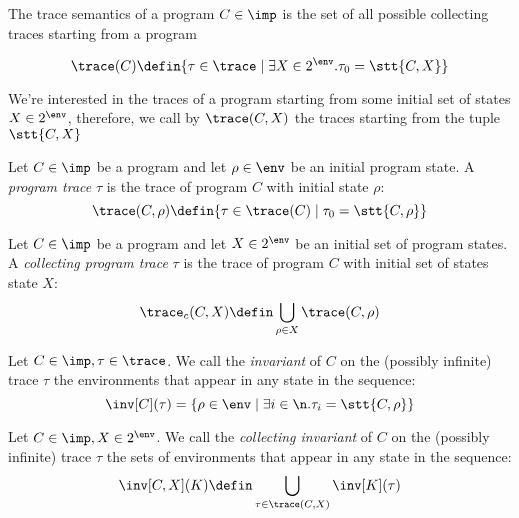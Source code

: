 \begin{definition}
  The trace semantics of a program \(C\in\imp\) is the set of all
  possible collecting traces starting from a program
  
  \[\trace(C) \defin \{\tau \in \trace \mid \exists X \in 2^\env . \tau_0 = \stt{ C, X } \}\]

\end{definition}

We're interested in the traces of a program starting from some initial
set of states \(X \in 2^\env\), therefore, we call by \(\trace
(C,X)\) the traces starting from the tuple \(\stt{ C, X
}\)

\begin{definition}
  Let \(C \in \imp\) be a program and let \(\rho \in \env\) be an
  initial program state. A \emph{program trace} \(\tau\) is the trace
  of program \(C\) with initial state \(\rho\): \[\trace (C,\rho) \defin
  \{\tau \in \trace (C) \mid \tau_0 = \stt{ C, \rho }\}\]
\end{definition}

\begin{definition}
  Let \(C \in \imp\) be a program and let \(X \in 2^\env\) be an
  initial set of program states. A \emph{collecting program trace}
  \(\tau\) is the trace of program \(C\) with initial set of states
  state \(X\): \[\trace_c (C,X) \defin \bigcup_{\rho \in
    X}\trace(C,\rho)\]
\end{definition}


\begin{definition}
  Let \(C \in \imp, \tau \in \trace\). We call the \emph{invariant} of
  \(C\) on the (possibly infinite) trace \(\tau\) the environments
  that appear in any state in the sequence: \[\inv[C](\tau) = \{ \rho
  \in \env \mid \exists i \in\n . \tau_i = \stt{C,\rho}\}\]
\end{definition}

\begin{definition}
  Let \(C \in \imp, X\in 2^\env\). We call the \emph{collecting
  invariant} of \(C\) on the (possibly infinite) trace \(\tau\) the
  sets of environments that appear in any state in the
  sequence: \[\inv[C,X](K) \defin \bigcup_{\tau \in \trace(C, X)} \inv[K](\tau)\]
\end{definition}


